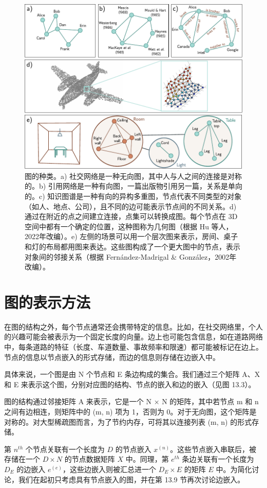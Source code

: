 \documentclass[lang=cn,newtx,10pt,scheme=chinese]{elegantbook}
\begin{document}
\begin{figure}[ht!]
\centering
\includegraphics[width=0.7\linewidth]{PDFFigures/UDLChap13PDF/GraphTypes.pdf}
\caption{图的种类。a) 社交网络是一种无向图，其中人与人之间的连接是对称的。b) 引用网络是一种有向图，一篇出版物引用另一篇，关系是单向的。c) 知识图谱是一种有向的异构多重图，节点代表不同类型的对象（如人、地点、公司），且不同的边可能表示节点间的不同关系。d) 通过在附近的点之间建立连接，点集可以转换成图。每个节点在 3D 空间中都有一个确定的位置，这种图称为几何图（根据 Hu 等人，2022年改编）。e) 左侧的场景可以用一个层次图来表示，房间、桌子和灯的布局都用图来表达。这些图构成了一个更大图中的节点，表示对象间的邻接关系（根据 Fernández-Madrigal \& González，2002年改编）。}
\end{figure}


\section{图的表示方法}
在图的结构之外，每个节点通常还会携带特定的信息。比如，在社交网络里，个人的兴趣可能会被表示为一个固定长度的向量。边上也可能包含信息，如在道路网络中，每条道路的特征（长度、车道数量、事故频率和限速）都可能被标记在边上。节点的信息以节点嵌入的形式存储，而边的信息则存储在边嵌入中。

具体来说，一个图是由 N 个节点和 E 条边构成的集合。我们通过三个矩阵 A、X 和 E 来表示这个图，分别对应图的结构、节点的嵌入和边的嵌入（见图 13.3）。

图的结构通过邻接矩阵 A 来表示，它是一个 N × N 的矩阵，其中若节点 m 和 n 之间有边相连，则矩阵中的 (m, n) 项为 1，否则为 0。对于无向图，这个矩阵是对称的。对大型稀疏图而言，为了节约内存，可将其以连接列表 (m, n) 的形式存储。

第 \(n^{th}\) 个节点关联有一个长度为 \(D\) 的节点嵌入 \(x^{(n)}\)。这些节点嵌入串联后，被存储在一个 \(D \times N\) 的节点数据矩阵 \(X\) 中。同理，第 \(e^{th}\) 条边关联有一个长度为 \(D_E\) 的边嵌入 \(e^{(e)}\)，这些边嵌入则被汇总进一个 \(D_E \times E\) 的矩阵 \(E\) 中。为简化讨论，我们在起初只考虑具有节点嵌入的图，并在第 13.9 节再次讨论边嵌入。
\end{document}
